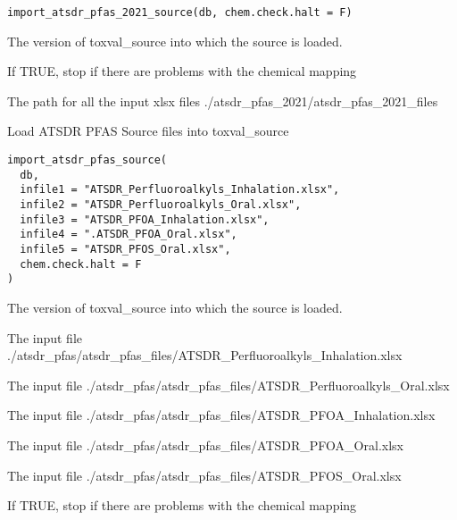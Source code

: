 \documentclass[letterpaper]{book}
\begin{document}
%
\begin{Usage}
\begin{verbatim}
import_atsdr_pfas_2021_source(db, chem.check.halt = F)
\end{verbatim}
\end{Usage}
%
\begin{Arguments}
\begin{ldescription}
\item[\code{db}] The version of toxval\_source into which the source is loaded.

\item[\code{chem.check.halt}] If TRUE, stop if there are problems with the chemical mapping

\item[\code{indir}] The path for all the input xlsx files ./atsdr\_pfas\_2021/atsdr\_pfas\_2021\_files
\end{ldescription}
\end{Arguments}
%
\begin{Description}\relax
Load ATSDR PFAS Source files into toxval\_source
\end{Description}
%
\begin{Usage}
\begin{verbatim}
import_atsdr_pfas_source(
  db,
  infile1 = "ATSDR_Perfluoroalkyls_Inhalation.xlsx",
  infile2 = "ATSDR_Perfluoroalkyls_Oral.xlsx",
  infile3 = "ATSDR_PFOA_Inhalation.xlsx",
  infile4 = ".ATSDR_PFOA_Oral.xlsx",
  infile5 = "ATSDR_PFOS_Oral.xlsx",
  chem.check.halt = F
)
\end{verbatim}
\end{Usage}
%
\begin{Arguments}
\begin{ldescription}
\item[\code{db}] The version of toxval\_source into which the source is loaded.

\item[\code{infile1}] The input file ./atsdr\_pfas/atsdr\_pfas\_files/ATSDR\_Perfluoroalkyls\_Inhalation.xlsx

\item[\code{infile2}] The input file ./atsdr\_pfas/atsdr\_pfas\_files/ATSDR\_Perfluoroalkyls\_Oral.xlsx

\item[\code{infile3}] The input file ./atsdr\_pfas/atsdr\_pfas\_files/ATSDR\_PFOA\_Inhalation.xlsx

\item[\code{infile4}] The input file ./atsdr\_pfas/atsdr\_pfas\_files/ATSDR\_PFOA\_Oral.xlsx

\item[\code{infile5}] The input file ./atsdr\_pfas/atsdr\_pfas\_files/ATSDR\_PFOS\_Oral.xlsx

\item[\code{chem.check.halt}] If TRUE, stop if there are problems with the chemical mapping
\end{ldescription}
\end{Arguments}
\end{document}
